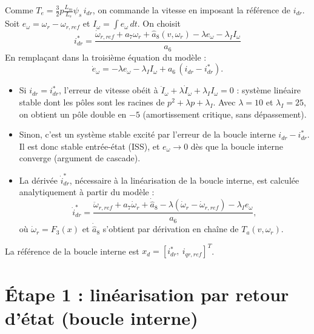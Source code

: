 \documentclass[11pt,a4paper]{article}
\begin{document}
Comme $T_e=\tfrac32p\frac{L_m}{L_s}\psi_s\,i_{dr}$, on commande la vitesse en imposant la référence de $i_{dr}$. Soit $e_\omega=\omega_r-\omega_{r,ref}$ et $I_\omega=\int e_\omega\,dt$. On choisit
\begin{equation}
\boxed{i^\ast_{dr}=\frac{\dot\omega_{r,ref}+a_7\omega_r+\hat a_8(v,\omega_r)-\lambda e_\omega-\lambda_I I_\omega}{a_6}}
\label{eq:vitesse}
\end{equation}
En remplaçant dans la troisième équation du modèle :
\[
\dot e_\omega=-\lambda e_\omega-\lambda_I I_\omega+a_6\,(i_{dr}-i^\ast_{dr}).
\]
\begin{itemize}
\item Si $i_{dr}=i^\ast_{dr}$, l'erreur de vitesse obéit à $\ddot I_\omega+\lambda\dot I_\omega+\lambda_I I_\omega=0$ : système linéaire stable dont les pôles sont les racines de $p^2+\lambda p+\lambda_I$. Avec $\lambda=10$ et $\lambda_I=25$, on obtient un pôle double en $-5$ (amortissement critique, sans dépassement).
\item Sinon, c'est un système stable excité par l'erreur de la boucle interne $i_{dr}-i^\ast_{dr}$. Il est donc stable entrée-état (ISS), et $e_\omega\to0$ dès que la boucle interne converge (argument de cascade).
\item La dérivée $\dot i^\ast_{dr}$, nécessaire à la linéarisation de la boucle interne, est calculée analytiquement à partir du modèle :
\[
\dot i^\ast_{dr}=\frac{\ddot\omega_{r,ref}+a_7\dot\omega_r+\dot{\hat a}_8-\lambda(\dot\omega_r-\dot\omega_{r,ref})-\lambda_I e_\omega}{a_6},
\]
où $\dot\omega_r=F_3(x)$ et $\dot{\hat a}_8$ s'obtient par dérivation en chaîne de $T_a(v,\omega_r)$.
\end{itemize}
La référence de la boucle interne est $x_d=[i^\ast_{dr},\ i_{qr,ref}]^T$.

\section{Étape 1 : linéarisation par retour d'état (boucle interne)}
\end{document}
